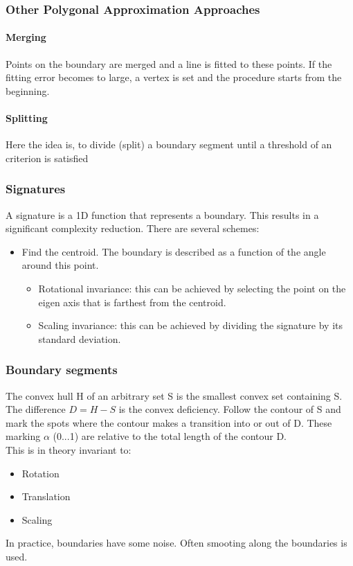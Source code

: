 \subsubsection{Other Polygonal Approximation Approaches}
\paragraph{Merging}
Points on the boundary are merged and a line is fitted to these points. If the fitting error becomes to large, a vertex is set and the procedure starts from the beginning.\\
\paragraph{Splitting}
Here the idea is, to divide (split) a boundary segment until a threshold of an criterion is satisfied
\subsubsection{Signatures}
A signature is a 1D function that represents a boundary. This results in a significant complexity reduction. There are several schemes:\\
\begin{itemize}
\item Find the centroid. The boundary is described as a function of the angle around this point.
\begin{itemize}
\item Rotational invariance: this can be achieved by selecting the point on the eigen axis that is farthest from the centroid.
\item Scaling invariance: this can be achieved by dividing the signature by its standard deviation.
\end{itemize}
\end{itemize}
\subsubsection{Boundary segments}
The convex hull H of an arbitrary set S is the smallest convex set containing S. The difference $D=H-S$ is the convex deficiency. Follow the contour of S and mark the spots where the contour makes a transition into or out of D. These marking $\alpha$ (0...1) are relative to the total length of the contour D.\\
This is in theory invariant to:\\
\begin{itemize}
\item Rotation
\item Translation
\item Scaling
\end{itemize}
In practice, boundaries have some noise. Often smooting along the boundaries is used.\\
